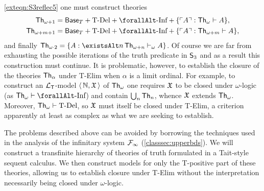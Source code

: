 \documentclass[UKenglish,cleveref,DIV=12]{scrartcl}
\let\forall\forallAlt
\let\exists\existsAlt
\theoremstyle{definition}
\theoremstyle{definition}
\begin{document}
\cref{exteqn:S3reflec5} one must construct theories
\begin{align*}
  \Th_{\omega +1}&=\BaseT+\text{T-Del}+\text{$\forall$-Inf}+\{\gn A:\Th_\omega\proves A\},\\
  \Th_{\omega +m+1}&=\BaseT+\text{T-Del}+\text{$\forall$-Inf}+\{\gn A:\Th_{\omega+m}\proves A\},
\end{align*}
and finally $\Th_{\omega\cdot2}=\{A:\exists n\,\Th_{\omega+n}\proves_\omega
A\}$. Of course we are far from exhausting the possible iterations of the truth
predicate in $\mathsf{S}_3$ and as a result this construction must continue.
It is problematic, however, to establish the closure of the theories
$\mathsf{Th}_\alpha$ under T-Elim when $\alpha$ is a limit ordinal. For example, to
construct an $\mathcal{L}_{\mathsf{T}}$-model $\langle\,\mathbb N,\mathfrak{X}\,\rangle$ of $\mathsf{Th}_\omega$ one requires $\mathfrak{X}$ to be
closed under $\omega$-logic (as $\Th_\omega\proves\text{$\forall$-Inf}$) and
contain $\bigcup_n\mathsf{Th}_n$, whence $\mathfrak{X}$ extends $\mathsf{Th}_\omega$. Moreover,
$\mathsf{Th}_\omega\vdash\text{T-Del}$, so $\mathfrak{X}$ must itself be closed under T-Elim, a
criterion apparently at least as complex as what we are seeking to establish.
%

The problems described above can be avoided by borrowing the techniques used in the analysis of the infinitary system $\mathcal{F}_\infty$ (\cref{classsec:upperbds}). We
will construct a transfinite hierarchy of theories of truth formulated in a
Tait-style sequent calculus. We then construct models for only the T-positive
part of these theories, allowing us to establish closure under T-Elim without
the interpretation necessarily being closed under $\omega$-logic.
\end{document}
